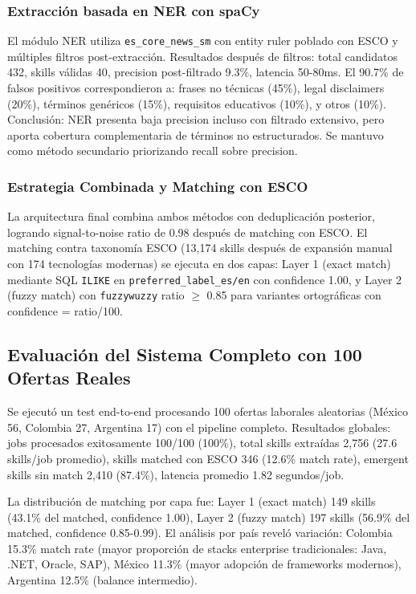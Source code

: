 \subsubsection{Extracción basada en NER con spaCy}

El módulo NER utiliza \texttt{es\_core\_news\_sm} con entity ruler poblado con ESCO y múltiples filtros post-extracción. Resultados después de filtros: total candidatos 432, skills válidas 40, precision post-filtrado 9.3\%, latencia 50-80ms. El 90.7\% de falsos positivos correspondieron a: frases no técnicas (45\%), legal disclaimers (20\%), términos genéricos (15\%), requisitos educativos (10\%), y otros (10\%). Conclusión: NER presenta baja precision incluso con filtrado extensivo, pero aporta cobertura complementaria de términos no estructurados. Se mantuvo como método secundario priorizando recall sobre precision.

\subsubsection{Estrategia Combinada y Matching con ESCO}

La arquitectura final combina ambos métodos con deduplicación posterior, logrando signal-to-noise ratio de 0.98 después de matching con ESCO. El matching contra taxonomía ESCO (13,174 skills después de expansión manual con 174 tecnologías modernas) se ejecuta en dos capas: Layer 1 (exact match) mediante SQL \texttt{ILIKE} en \texttt{preferred\_label\_es/en} con confidence 1.00, y Layer 2 (fuzzy match) con \texttt{fuzzywuzzy} ratio $\geq$ 0.85 para variantes ortográficas con confidence = ratio/100.

\subsection{Evaluación del Sistema Completo con 100 Ofertas Reales}

Se ejecutó un test end-to-end procesando 100 ofertas laborales aleatorias (México 56, Colombia 27, Argentina 17) con el pipeline completo. Resultados globales: jobs procesados exitosamente 100/100 (100\%), total skills extraídas 2,756 (27.6 skills/job promedio), skills matched con ESCO 346 (12.6\% match rate), emergent skills sin match 2,410 (87.4\%), latencia promedio 1.82 segundos/job.

La distribución de matching por capa fue: Layer 1 (exact match) 149 skills (43.1\% del matched, confidence 1.00), Layer 2 (fuzzy match) 197 skills (56.9\% del matched, confidence 0.85-0.99). El análisis por país reveló variación: Colombia 15.3\% match rate (mayor proporción de stacks enterprise tradicionales: Java, .NET, Oracle, SAP), México 11.3\% (mayor adopción de frameworks modernos), Argentina 12.5\% (balance intermedio).

